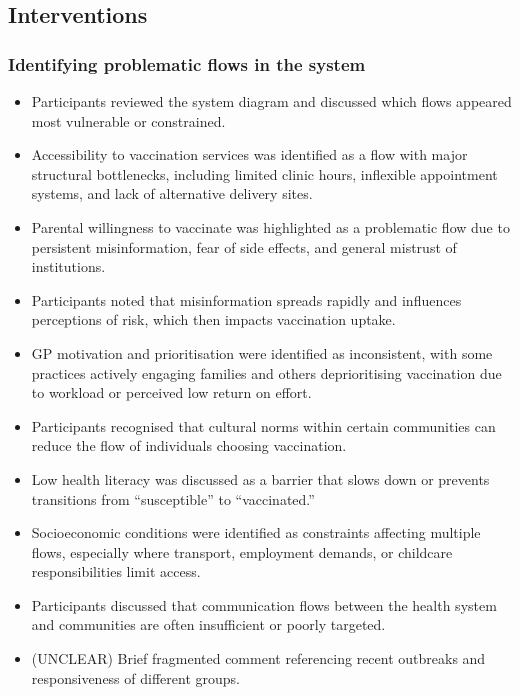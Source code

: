 \documentclass{article}
\begin{document}
\subsection{Interventions}

\subsubsection{Identifying problematic flows in the system}

\begin{itemize}
    \item Participants reviewed the system diagram and discussed which flows appeared most vulnerable or constrained.
    \item Accessibility to vaccination services was identified as a flow with major structural bottlenecks, including limited clinic hours, inflexible appointment systems, and lack of alternative delivery sites.
    \item Parental willingness to vaccinate was highlighted as a problematic flow due to persistent misinformation, fear of side effects, and general mistrust of institutions.
    \item Participants noted that misinformation spreads rapidly and influences perceptions of risk, which then impacts vaccination uptake.
    \item GP motivation and prioritisation were identified as inconsistent, with some practices actively engaging families and others deprioritising vaccination due to workload or perceived low return on effort.
    \item Participants recognised that cultural norms within certain communities can reduce the flow of individuals choosing vaccination.
    \item Low health literacy was discussed as a barrier that slows down or prevents transitions from “susceptible” to “vaccinated.”
    \item Socioeconomic conditions were identified as constraints affecting multiple flows, especially where transport, employment demands, or childcare responsibilities limit access.
    \item Participants discussed that communication flows between the health system and communities are often insufficient or poorly targeted.
    \item (UNCLEAR) Brief fragmented comment referencing recent outbreaks and responsiveness of different groups.
\end{itemize}
\end{document}
